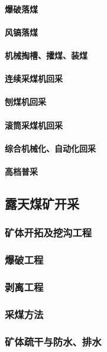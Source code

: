 \documentclass[UTF8]{../../ApplicationUniverse}
\begin{document}
            \paragraph{爆破落煤}
            \paragraph{风镐落煤}
            \paragraph{机械掏槽、攉煤、装煤}
            \paragraph{连续采煤机回采}
            \paragraph{刨煤机回采}
            \paragraph{滚筒采煤机回采}
            \paragraph{综合机械化、自动化回采}
            \paragraph{高档普采}
    \subsection{露天煤矿开采}
        \subsubsection{矿体开拓及挖沟工程}
        \subsubsection{爆破工程}
        \subsubsection{剥离工程}
        \subsubsection{采煤方法}
        \subsubsection{矿体疏干与防水、排水}
\end{document}
